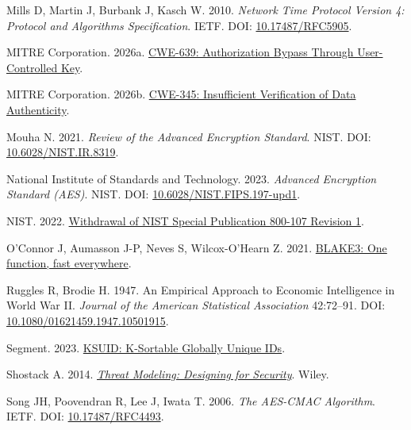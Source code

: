 \documentclass[fleqn,10pt,lineno]{wlpeerj}
\newlength{\cslhangindent}
\newenvironment{CSLReferences}[2]
 {\begin{list}{}{%
  \setlength{\itemindent}{0pt}
  \setlength{\leftmargin}{0pt}
  \setlength{\parsep}{0pt}
  \ifodd #1
   \setlength{\leftmargin}{\cslhangindent}
   \setlength{\itemindent}{-1\cslhangindent}
  \fi
  \setlength{\itemsep}{#2\baselineskip}}}
 {\end{list}}
\begin{document}
\begin{CSLReferences}{1}{0}
Mills D, Martin J, Burbank J, Kasch W. 2010. \emph{{Network Time
Protocol Version 4: Protocol and Algorithms Specification}}. IETF. DOI:
\href{https://doi.org/10.17487/RFC5905}{10.17487/RFC5905}.

MITRE Corporation. 2026a.
\href{https://cwe.mitre.org/data/definitions/639.html}{{CWE-639:
Authorization Bypass Through User-Controlled Key}}.

MITRE Corporation. 2026b.
\href{https://cwe.mitre.org/data/definitions/345.html}{{CWE-345:
Insufficient Verification of Data Authenticity}}.

Mouha N. 2021. \emph{{Review of the Advanced Encryption Standard}}.
NIST. DOI:
\href{https://doi.org/10.6028/NIST.IR.8319}{10.6028/NIST.IR.8319}.

National Institute of Standards and Technology. 2023. \emph{{Advanced
Encryption Standard (AES)}}. NIST. DOI:
\href{https://doi.org/10.6028/NIST.FIPS.197-upd1}{10.6028/NIST.FIPS.197-upd1}.

NIST. 2022.
\href{https://csrc.nist.gov/news/2022/withdrawal-of-nist-sp-800-107-revision-1}{{Withdrawal
of NIST Special Publication 800-107 Revision 1}}.

O'Connor J, Aumasson J-P, Neves S, Wilcox-O'Hearn Z. 2021.
\href{https://github.com/BLAKE3-team/BLAKE3-specs/blob/ac78a717924dd9e6f16f547baa916c6f71470b1a/blake3.pdf}{{BLAKE3:
One function, fast everywhere}}.

Ruggles R, Brodie H. 1947. {An Empirical Approach to Economic
Intelligence in World War II}. \emph{Journal of the American Statistical
Association} 42:72--91. DOI:
\href{https://doi.org/10.1080/01621459.1947.10501915}{10.1080/01621459.1947.10501915}.

Segment. 2023.
\href{https://github.com/segmentio/ksuid/blob/d33724947fcfba7949906c2b1821e96a1c8d06e7/README.md}{{KSUID:
K-Sortable Globally Unique IDs}}.

Shostack A. 2014.
\emph{\href{https://www.wiley.com/en-us/Threat+Modeling\%3A+Designing+for+Security-p-9781118809990}{{Threat
Modeling: Designing for Security}}}. Wiley.

Song JH, Poovendran R, Lee J, Iwata T. 2006. \emph{{The AES-CMAC
Algorithm}}. IETF. DOI:
\href{https://doi.org/10.17487/RFC4493}{10.17487/RFC4493}.


\end{CSLReferences}
\end{document}
